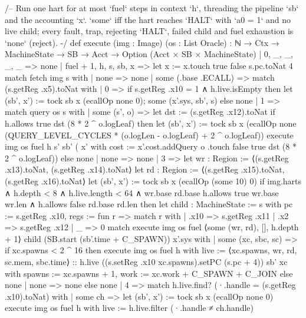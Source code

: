 \begin{leancode}[fontsize=\scriptsize,label={\footnotesize Contract/Machine.lean}]
/-- Run one hart for at most `fuel` steps in context `h`, threading the pipeline `sb` and the
accounting `x`. `some` iff the hart reaches `HALT` with `a0 = 1` and no live child; every
fault, trap, rejecting `HALT`, failed child and fuel exhaustion is `none` (reject). -/
def execute (img : Image) (os : List Oracle) :
    ℕ → Ctx → MachineState → SB → Acct → Option (Acct × SB × MachineState)
  | 0, _, _, _, _ => none
  | fuel + 1, h, s, sb, x =>
    let x := x.touch true false s.pc.toNat 4
    match fetch img s with
    | none => none
    | some (.base .ECALL) =>
      match (s.getReg .x5).toNat with
      | 0 => if s.getReg .x10 = 1 ∧ h.live.isEmpty then
          let (sb', x') := tock sb x (ecallOp none 0); some (x'.sys, sb', s) else none
      | 1 => match query os s with
        | some (s', o) =>
          let dst := (s.getReg .x12).toNat
          if h.allows true dst (8 * 2 ^ o.logLeaf) then
            let (sb', x') := tock sb x (ecallOp none
              (QUERY_LEVEL_CYCLES * (o.logLen - o.logLeaf) + 2 ^ o.logLeaf))
            execute img os fuel h s' sb'
              ({ x' with cost := x'.cost.addQuery o }.touch false true dst (8 * 2 ^ o.logLeaf))
          else none
        | none => none
      | 3 =>
        let wr : Region := ⟨(s.getReg .x13).toNat, (s.getReg .x14).toNat⟩
        let rd : Region := ⟨(s.getReg .x15).toNat, (s.getReg .x16).toNat⟩
        let (sb', x') := tock sb x (ecallOp (some 10) 0)
        if img.harts ∧ h.depth < 8 ∧ h.live.length < 64 ∧ wr.base %
            rd.base %
            h.allows true wr.base wr.len ∧ h.allows false rd.base rd.len then
          let child : MachineState := { s with pc := s.getReg .x10, regs := fun r =>
            match r with | .x10 => s.getReg .x11 | .x2 => s.getReg .x12 | _ => 0 }
          match execute img os fuel ⟨some (wr, rd), [], h.depth + 1⟩ child
              (SB.start (sb'.time + C_SPAWN)) x'.sys with
          | some (xc, sbc, sc) =>
            if xc.spawns < 2 ^ 16 then
              execute img os fuel { h with live := ⟨xc.spawns, wr, rd, sc.mem, sbc.time⟩ :: h.live }
                ((s.setReg .x10 xc.spawns).setPC (s.pc + 4)) sb'
                { xc with spawns := xc.spawns + 1, work := xc.work + C_SPAWN + C_JOIN }
            else none
          | none => none
        else none
      | 4 =>
        match h.live.find? (·.handle = (s.getReg .x10).toNat) with
        | some ch =>
          let (sb', x') := tock sb x (ecallOp none 0)
          execute img os fuel { h with live := h.live.filter (·.handle ≠ ch.handle) }

\end{leancode}
